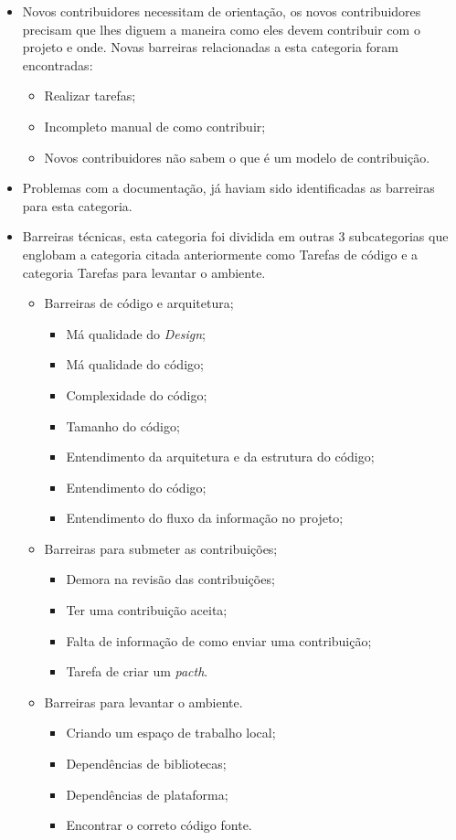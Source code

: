 \begin{itemize}
\item Novos contribuidores necessitam de orientação, os novos contribuidores precisam
que lhes diguem a maneira como eles devem contribuir com o projeto e onde. Novas barreiras
relacionadas a esta categoria foram encontradas:
	
	\begin{itemize}
	\item Realizar tarefas;
	\item Incompleto manual de como contribuir;
	\item Novos contribuidores não sabem o que é um modelo de contribuição.
	\end{itemize}

\item Problemas com a documentação, já haviam sido identificadas as barreiras para esta categoria.

\item Barreiras técnicas, esta categoria foi dividida em outras 3 subcategorias que englobam
a categoria citada anteriormente como Tarefas de código e a categoria Tarefas para levantar o ambiente.
	
	\begin{itemize}
	\item Barreiras de código e arquitetura;
		\begin{itemize}
		\item Má qualidade do \textit{Design};
		\item Má qualidade do código;
		\item Complexidade do código;
		\item Tamanho do código;
		\item Entendimento da arquitetura e da estrutura do código;
		\item Entendimento do código;
		\item Entendimento do fluxo da informação no projeto;
		\end{itemize}
	\item Barreiras para submeter as contribuições;
		\begin{itemize}
		\item Demora na revisão das contribuições;
		\item Ter uma contribuição aceita;
		\item Falta de informação de como enviar uma contribuição;
		\item Tarefa de criar um \textit{pacth}.
		\end{itemize}
	\item Barreiras para levantar o ambiente.
		\begin{itemize}
		\item Criando um espaço de trabalho local;
		\item Dependências de bibliotecas;
		\item Dependências de plataforma;
		\item Encontrar o correto código fonte.
		\end{itemize}
	\end{itemize}


\end{itemize}
